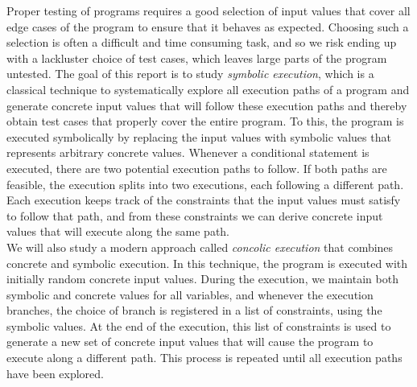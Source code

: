 Proper testing of programs requires a good selection of input values that cover all edge cases of the program to ensure that it behaves as expected. Choosing such a selection is often a difficult and time consuming task, and so we risk ending up with a lackluster choice of test cases, which leaves large parts of the program untested. The goal of this report is to study \emph{symbolic execution}, which is a classical technique to systematically explore all execution paths of a program and generate concrete input values that will follow these execution paths and thereby obtain test cases that properly cover the entire program. To this, the program is executed symbolically by replacing the input values with symbolic values that represents arbitrary concrete values. Whenever a conditional statement is executed, there are two potential execution paths to follow. If both paths are feasible, the execution splits into two executions, each following a different path. Each execution keeps track of the constraints that the input values must satisfy to follow that path, and from these constraints we can derive concrete input values that will execute along the same path.
\\ 
We will also study a modern approach called \emph{concolic execution} that combines concrete and symbolic execution. In this technique, the program is executed with initially random concrete input values. During the execution, we maintain both symbolic and concrete values for all variables, and whenever the execution branches, the choice of branch is registered in a list of constraints, using the symbolic values. At the end of the execution, this list of constraints is used to generate a new set of concrete input values that will cause the program to execute along a different path. This process is repeated until all execution paths have been explored.
 
\iffalse
\newpage In chapter 2 we give a motivating example, to illustrate the usefulness of symbolic execution. In chapter 3 we will describe the principles of classical symbolic execution.  
 We will also study some key challenges and limitations to this technique. 
 In chapter 4 we will describe the principles of concolic execution. We will also be comparing the two techniques to see what advantages concolic execution offer over classical symbolic execution. Finally, in chapter 5 and 6 we demonstrate the principles of symbolic execution by implementing a concrete and a symbolic interpreter for a small toy language.  
 
 \fi